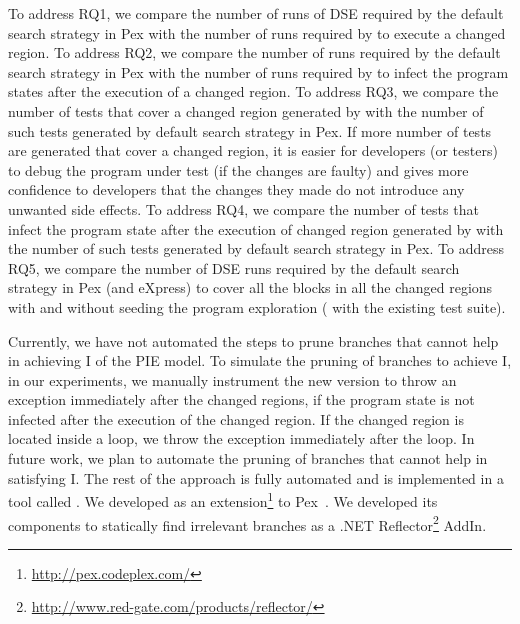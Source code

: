  To address RQ1, we compare the number of runs of DSE required by the default search strategy in Pex with the number of runs required by  to execute a changed region. To address RQ2, we compare the number of runs required by the default search strategy in Pex with the number of runs required by  to infect the program states after the execution of a changed region. To address RQ3, we compare the number of tests that cover a changed region generated by  with the number of such tests generated by default search strategy in Pex. If more number of tests are generated that cover a changed region, it is easier for developers (or testers) to debug the program under test (if the changes are faulty) and gives more confidence to developers that the changes they made do not introduce any unwanted side effects.
To address RQ4, we compare the number of tests that infect the program state after the execution of changed region generated by  with the number of such tests generated by default search strategy in Pex.
To address RQ5, we compare the number of DSE runs required by the default search strategy in Pex (and eXpress) to cover all the blocks in all the changed regions with and without seeding the program exploration ( with the existing test suite).


Currently, we have not automated the steps to prune branches that cannot help in achieving I of the PIE model. To simulate the pruning of branches to achieve I, in our experiments, we manually instrument the new version to throw an exception immediately  after the changed regions, if the program state is not infected after the execution of the changed region. If the changed region is located inside a loop, we throw the exception immediately after the loop.
In future work, we plan to automate the pruning of branches that cannot help in satisfying I. 
The rest of the approach is fully automated and is implemented in a tool called . We developed  as an extension\footnote{\url{http://pex.codeplex.com/}} to Pex~\cite{Pex}. We developed its components to statically find irrelevant branches as a .NET Reflector\footnote{\url{http://www.red-gate.com/products/reflector/}} AddIn.


